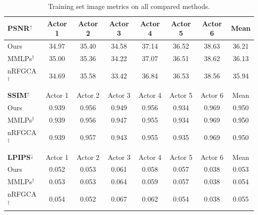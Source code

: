 \documentclass[runningheads]{llncs}
\begin{document}
\begin{table}[!h]
    \centering
    \scriptsize
    \caption{Training set image metrics on all compared methods.}
    \setlength{\tabcolsep}{3pt}
\begin{tabular}{lcccccc|c}
\textbf{PSNR$^\uparrow$} & Actor 1 & Actor 2 & Actor 3 & Actor 4 & Actor 5 & Actor 6 & Mean \\ \hline
Ours & \cellcolor{best!15}34.97 & \cellcolor{best!15}35.40 & \cellcolor{best!40}34.58 & \cellcolor{best!40}37.14 & \cellcolor{best!15}36.52 & \cellcolor{best!40}38.63 & \cellcolor{best!40}36.21 \\
MMLPs$^\dagger$ & \cellcolor{best!40}35.00 & \cellcolor{best!00}35.36 & \cellcolor{best!15}34.22 & \cellcolor{best!15}37.07 & \cellcolor{best!00}36.51 & \cellcolor{best!15}38.62 & \cellcolor{best!15}36.13 \\
nRFGCA$^\dagger$ & \cellcolor{best!00}34.69 & \cellcolor{best!40}35.58 & \cellcolor{best!00}33.42 & \cellcolor{best!00}36.84 & \cellcolor{best!40}36.53 & \cellcolor{best!00}38.56 & \cellcolor{best!00}35.94 \\
\\
\textbf{SSIM$^\uparrow$} & Actor 1 & Actor 2 & Actor 3 & Actor 4 & Actor 5 & Actor 6 & Mean \\ \hline
Ours & \cellcolor{best!40}0.939 & \cellcolor{best!15}0.956 & \cellcolor{best!40}0.949 & \cellcolor{best!40}0.956 & \cellcolor{best!00}0.934 & \cellcolor{best!15}0.969 & \cellcolor{best!40}0.950 \\
MMLPs$^\dagger$ & \cellcolor{best!00}0.939 & \cellcolor{best!00}0.956 & \cellcolor{best!15}0.947 & \cellcolor{best!15}0.955 & \cellcolor{best!15}0.934 & \cellcolor{best!00}0.969 & \cellcolor{best!40}0.950 \\
nRFGCA$^\dagger$ & \cellcolor{best!15}0.939 & \cellcolor{best!40}0.957 & \cellcolor{best!00}0.943 & \cellcolor{best!00}0.955 & \cellcolor{best!40}0.935 & \cellcolor{best!40}0.969 & \cellcolor{best!40}0.950 \\
\\
\textbf{LPIPS$^\downarrow$} & Actor 1 & Actor 2 & Actor 3 & Actor 4 & Actor 5 & Actor 6 & Mean \\ \hline
Ours & \cellcolor{best!40}0.052 & \cellcolor{best!15}0.053 & \cellcolor{best!40}0.061 & \cellcolor{best!40}0.058 & \cellcolor{best!15}0.057 & \cellcolor{best!40}0.038 & \cellcolor{best!40}0.053 \\
MMLPs$^\dagger$ & \cellcolor{best!15}0.053 & \cellcolor{best!00}0.053 & \cellcolor{best!15}0.064 & \cellcolor{best!15}0.059 & \cellcolor{best!00}0.057 & \cellcolor{best!15}0.038 & \cellcolor{best!15}0.054 \\
nRFGCA$^\dagger$ & \cellcolor{best!00}0.054 & \cellcolor{best!40}0.052 & \cellcolor{best!00}0.067 & \cellcolor{best!00}0.062 & \cellcolor{best!40}0.054 & \cellcolor{best!00}0.038 & \cellcolor{best!00}0.055
\end{tabular}
    \label{tab:quant_percapture_train}
\end{table}
\end{document}
